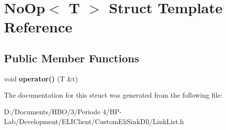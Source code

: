 \hypertarget{struct_no_op}{}\section{No\+Op$<$ T $>$ Struct Template Reference}
\label{struct_no_op}
\subsection*{Public Member Functions}
\begin{DoxyCompactItemize}
\item 
\mbox{\label{struct_no_op_a1581c0c202772f3eb944e70d2fb681eb}} 
void {\bfseries operator()} (T \&t)
\end{DoxyCompactItemize}


The documentation for this struct was generated from the following file\+:\begin{DoxyCompactItemize}
\item 
D\+:/\+Documents/\+H\+B\+O/3/\+Periode 4/\+H\+P-\/\+Lab/\+Development/\+E\+L\+I\+Client/\+Custom\+Eli\+Sink\+Dll/Link\+List.\+h\end{DoxyCompactItemize}

